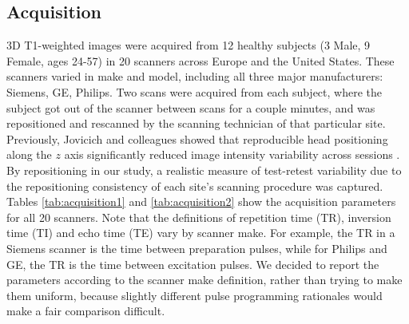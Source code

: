 \subsection{Acquisition}
3D T1-weighted images were acquired from 12 healthy subjects (3 Male, 9 Female, ages 24-57) in 20 scanners across Europe and the United States. These scanners varied in make and model, including all three major manufacturers: Siemens, GE, Philips. Two scans were acquired from each subject, where the subject got out of the scanner between scans for a couple minutes, and was repositioned and rescanned by the scanning technician of that particular site. Previously, Jovicich and colleagues showed that reproducible head positioning along the $z$ axis significantly reduced image intensity variability across sessions \cite{freesurferReliability}. By repositioning in our study, a realistic measure of test-retest variability due to the repositioning consistency of each site's scanning procedure was captured. Tables \ref{tab:acquisition1} and \ref{tab:acquisition2} show the acquisition parameters for all 20 scanners. Note that the definitions of repetition time (TR), inversion time (TI) and echo time (TE) vary by scanner make. For example, the TR in a Siemens scanner is the time between preparation pulses, while for Philips and GE, the TR is the time between excitation pulses. We decided to report the parameters according to the scanner make definition, rather than trying to make them uniform, because slightly different pulse programming rationales would make a fair comparison difficult.
